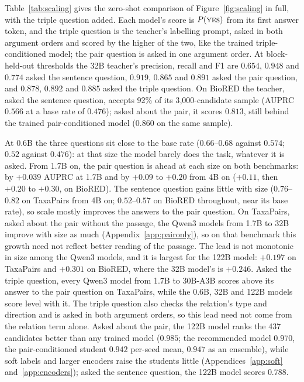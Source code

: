 \documentclass[11pt]{article}
\newcommand{\bench}{\mbox{TaxaPairs}}
\begin{document}
Table~\ref{tab:scaling} gives the zero-shot comparison of Figure~\ref{fig:scaling} in full, with the
triple question added. Each model's score is $P(\textsc{yes})$ from its first answer token, and the
triple question is the teacher's labelling prompt, asked in both argument orders and scored by the
higher of the two, like the trained triple-conditioned model; the pair question is asked in one argument order. At block-held-out thresholds the 32B teacher's precision, recall
and F1 are $0.654$, $0.948$ and $0.774$ asked the sentence question, $0.919$, $0.865$ and $0.891$
asked the pair question, and $0.878$, $0.892$ and $0.885$ asked the triple question. On BioRED the teacher, asked the
sentence question, accepts 92\% of its 3{,}000-candidate sample (AUPRC $0.566$ at a base rate of
$0.476$); asked about the pair, it scores $0.813$, still behind the trained pair-conditioned model
($0.860$ on the same sample).

At 0.6B the three questions sit close to the base rate ($0.66$--$0.68$ against $0.574$; $0.52$
against $0.476$): at that size the model barely does the task, whatever it is asked. From 1.7B on,
the pair question is ahead at each size on both benchmarks: by $+0.039$ AUPRC at 1.7B and by $+0.09$
to $+0.20$ from 4B on ($+0.11$, then $+0.20$ to $+0.30$, on BioRED)\@. The sentence question gains
little with size ($0.76$--$0.82$ on \bench{} from 4B on; $0.52$--$0.57$ on BioRED throughout, near its
base rate), so scale mostly improves the answers to the pair question. On \bench{}, asked about the pair
without the passage, the Qwen3 models from 1.7B to 32B improve with size as much
(Appendix~\ref{app:paironly}), so on that benchmark this growth need not reflect better reading of the passage. The lead is not monotonic in
size among the Qwen3 models, and it is largest for the 122B model: $+0.197$ on \bench{} and $+0.301$ on BioRED, where the 32B model's is $+0.246$. Asked the triple question, every Qwen3
model from 1.7B to 30B-A3B scores above its answer to the pair question on \bench{}, while the
0.6B, 32B and 122B models score level with it. The triple question also checks the relation's type
and direction and is asked in both argument orders, so this lead need not come from the relation
term alone. Asked about the pair, the 122B model ranks the 437 candidates better
than any trained model ($0.985$; the recommended model $0.970$, the pair-conditioned student
$0.942$ per-seed mean, $0.947$ as an ensemble), while soft labels and larger encoders raise the
students little (Appendices~\ref{app:soft} and~\ref{app:encoders}); asked the sentence question,
the 122B model scores $0.788$.
\end{document}
